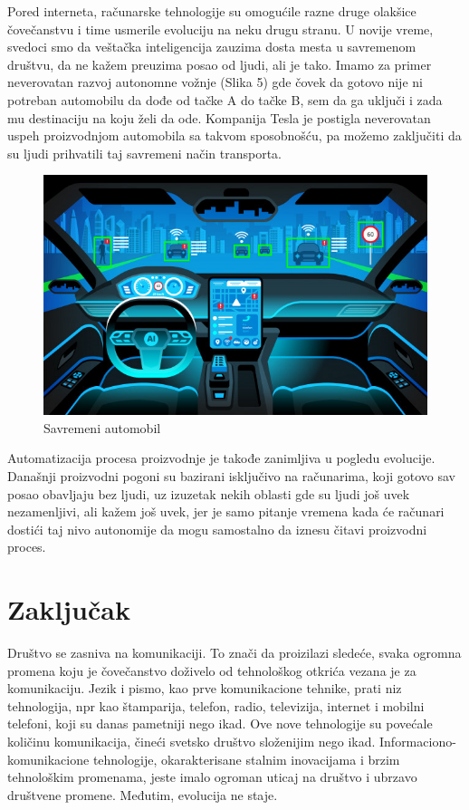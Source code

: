 \documentclass[10pt]{article}
\begin{document}
	Pored interneta, računarske tehnologije su omogućile razne druge olakšice čovečanstvu i time usmerile evoluciju na neku drugu stranu. U novije vreme, svedoci smo da veštačka inteligencija zauzima dosta mesta u savremenom društvu, da ne kažem preuzima posao od ljudi, ali je tako. Imamo za primer neverovatan razvoj autonomne vožnje (Slika 5) gde čovek da gotovo nije ni potreban automobilu da dođe od tačke A do tačke B, sem da ga uključi i zada mu destinaciju na koju želi da ode. Kompanija Tesla je postigla neverovatan uspeh proizvodnjom automobila sa takvom sposobnošću, pa možemo zaključiti da su ljudi prihvatili taj savremeni način transporta. 
	
	
\begin{figure}
    \centering
    \includegraphics[scale=0.5]{car.jpg}
    \caption{Savremeni automobil}
\end{figure}
	
	Automatizacija procesa proizvodnje je takođe zanimljiva u pogledu evolucije. Današnji proizvodni pogoni su bazirani isključivo na računarima, koji gotovo sav posao obavljaju bez ljudi, uz izuzetak nekih oblasti gde su ljudi još uvek nezamenljivi, ali kažem još uvek, jer je samo pitanje vremena kada će računari dostići taj nivo autonomije da mogu samostalno da iznesu čitavi proizvodni proces.
    
    \section{Zaključak}
 
    Društvo se zasniva na komunikaciji. To znači da proizilazi sledeće, svaka ogromna promena koju je čovečanstvo doživelo od tehnološkog otkrića vezana je za komunikaciju. Jezik i pismo, kao prve komunikacione tehnike, prati niz tehnologija, npr kao štamparija, telefon, radio, televizija, internet i mobilni  telefoni, koji su danas pametniji nego ikad. Ove nove tehnologije su povećale količinu komunikacija, čineći svetsko društvo složenijim nego ikad. Informaciono-komunikacione tehnologije, okarakterisane stalnim inovacijama i brzim tehnološkim promenama, jeste imalo ogroman uticaj na društvo i ubrzavo društvene promene. Međutim, evolucija ne staje.
    
\end{document}
